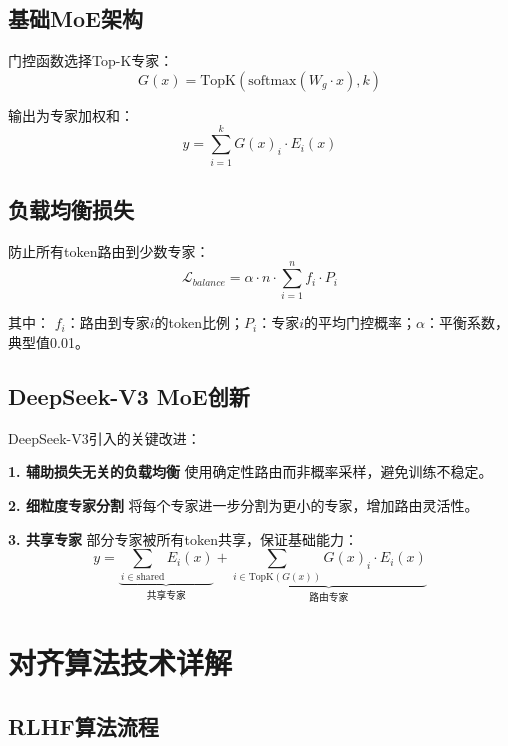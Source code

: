 \subsection{基础MoE架构}

门控函数选择Top-K专家：
\begin{equation}
G(x) = \text{TopK}(\text{softmax}(W_g \cdot x), k)
\end{equation}

输出为专家加权和：
\begin{equation}
y = \sum_{i=1}^{k} G(x)_i \cdot E_i(x)
\end{equation}

\subsection{负载均衡损失}

防止所有token路由到少数专家：
\begin{equation}
\mathcal{L}_{balance} = \alpha \cdot n \cdot \sum_{i=1}^{n} f_i \cdot P_i
\end{equation}

其中：
$f_i$：路由到专家$i$的token比例；$P_i$：专家$i$的平均门控概率；$\alpha$：平衡系数，典型值0.01。

\subsection{DeepSeek-V3 MoE创新}

DeepSeek-V3引入的关键改进：

\textbf{1. 辅助损失无关的负载均衡}
使用确定性路由而非概率采样，避免训练不稳定。

\textbf{2. 细粒度专家分割}
将每个专家进一步分割为更小的专家，增加路由灵活性。

\textbf{3. 共享专家}
部分专家被所有token共享，保证基础能力：
\begin{equation}
y = \underbrace{\sum_{i \in \text{shared}} E_i(x)}_{\text{共享专家}} + \underbrace{\sum_{i \in \text{TopK}(G(x))} G(x)_i \cdot E_i(x)}_{\text{路由专家}}
\end{equation}

\section{对齐算法技术详解}

\subsection{RLHF算法流程}

